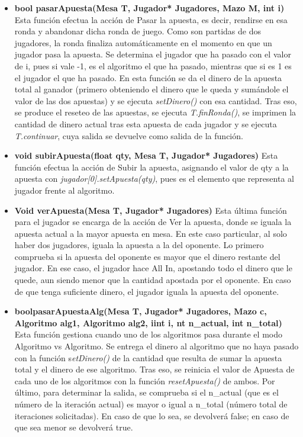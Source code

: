 \begin{itemize}
\item \textbf{ bool pasarApuesta(Mesa T, Jugador* Jugadores, Mazo M, int i)}
Esta función efectua la acción de Pasar la apuesta, es decir, rendirse en esa ronda y abandonar dicha ronda de juego. Como son partidas de dos jugadores, la ronda finaliza automáticamente en el momento en que un jugador pasa la apuesta.  
Se determina el jugador que ha pasado con el valor de i, pues si vale -1, es el algoritmo el que ha pasado, mientras que si es 1 es el jugador el que ha pasado.
En esta función se da el dinero de la apuesta total al ganador (primero obteniendo el dinero que le queda y sumándole el valor de las dos apuestas) y se ejecuta \textit{setDinero()} con esa cantidad.
Tras eso, se produce el reseteo de las apuestas, se ejecuta \textit{T.finRonda()}, se imprimen la cantidad de dinero actual tras esta apuesta de cada jugador y se ejecuta \textit{T.continuar}, cuya salida se devuelve como salida de la función.
\item \textbf{void subirApuesta(float qty, Mesa T, Jugador* Jugadores)}
Esta función efectua la acción de Subir la apuesta, asignando el valor de qty a la apuesta con \textit{jugador[0].setApuesta(qty)}, pues es el elemento que representa al jugador frente al algoritmo.
\item \textbf{Void verApuesta(Mesa T, Jugador* Jugadores)}
Esta última función para el jugador se encarga de la acción de Ver la apuesta, donde se iguala la apuesta actual a la mayor apuesta en mesa. En este caso particular, al solo haber dos jugadores, iguala la apuesta a la del oponente.
Lo primero comprueba si la apuesta del oponente es mayor que el dinero restante del jugador. En ese caso, el jugador hace All In, apostando todo el dinero que le quede, aun siendo menor que la cantidad apostada por el oponente. En caso de que tenga suficiente dinero, el jugador iguala la apuesta del oponente.
\item \textbf{boolpasarApuestaAlg(Mesa T, Jugador* Jugadores, Mazo c, Algoritmo alg1, Algoritmo alg2, iint i, nt n\_actual, int n\_total)}
Esta función gestiona cuando uno de los algoritmos pasa durante el modo Algoritmo vs Algoritmo.
Se entrega el dinero al algoritmo que no haya pasado con la función s\textit{etDinero()} de la cantidad que resulta de sumar la apuesta total y el dinero de ese algoritmo. Tras eso, se reinicia el valor de Apuesta de cada uno de los algoritmos con la función \textit{resetApuesta()} de ambos.
Por último, para determinar la salida, se comprueba si el n\_actual (que es el número de la iteración actual) es mayor o igual a n\_total (número total de iteraciones solicitadas). En caso de que lo sea, se devolverá false; en caso de que sea menor se devolverá true.

\end{itemize}
